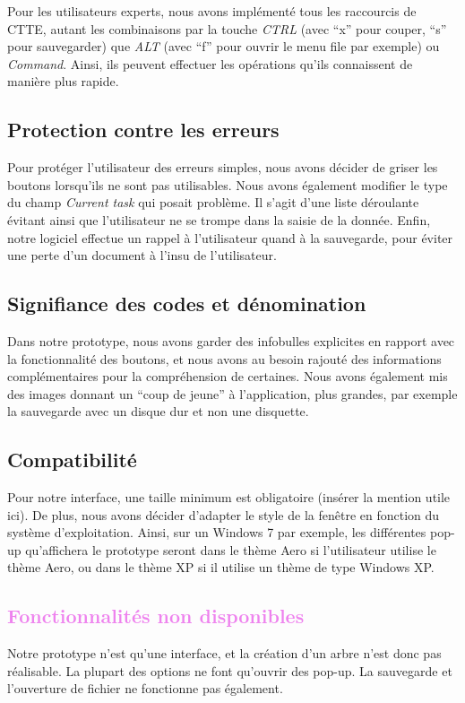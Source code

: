 \documentclass[12pt, a4paper]{article}
\begin{document}
Pour les utilisateurs experts, nous avons implémenté tous les raccourcis de CTTE, autant les combinaisons par la touche \emph{CTRL} (avec ``x'' pour couper, ``s'' pour sauvegarder) que \emph{ALT} (avec ``f'' pour ouvrir le menu file par exemple) ou \emph{Command}. Ainsi, ils peuvent effectuer les opérations qu'ils connaissent de manière plus rapide. 
\textcolor{NavyBlue}{\subsection{Protection contre les erreurs}}

Pour protéger l'utilisateur des erreurs simples, nous avons décider de griser les boutons lorsqu'ils ne sont pas utilisables. Nous avons également modifier le type du champ \emph{Current task} qui posait problème. Il s'agit d'une liste déroulante évitant ainsi que l'utilisateur ne se trompe dans la saisie de la donnée. Enfin, notre logiciel effectue un rappel à l'utilisateur quand à la sauvegarde, pour éviter une perte d'un document à l'insu de l'utilisateur.

\textcolor{NavyBlue}{\subsection{Signifiance des codes et dénomination}}

Dans notre prototype, nous avons garder des infobulles explicites en rapport avec la fonctionnalité des boutons, et nous avons au besoin rajouté des informations complémentaires pour la compréhension de certaines. Nous avons également mis des images donnant un ``coup de jeune'' à l'application, plus grandes, par exemple la sauvegarde avec un disque dur et non une disquette.

\textcolor{NavyBlue}{\subsection{Compatibilité}}

Pour notre interface, une taille minimum est obligatoire (insérer la mention utile ici). De plus, nous avons décider d'adapter le style de la fenêtre en fonction du système d'exploitation. Ainsi, sur un Windows 7 par exemple, les différentes pop-up qu'affichera le prototype seront dans le thème Aero si l'utilisateur utilise le thème Aero, ou dans le thème XP si il utilise un thème de type Windows XP.

\textcolor{Violet}{\section{Fonctionnalités non disponibles}}

Notre prototype n'est qu'une interface, et la création d'un arbre n'est donc pas réalisable. La plupart des options ne font qu'ouvrir des pop-up. La sauvegarde et l'ouverture de fichier ne fonctionne pas également.
\end{document}
